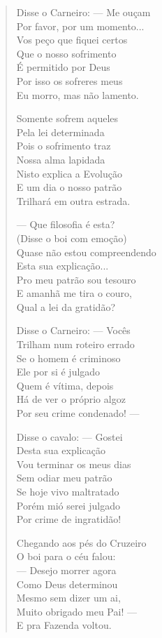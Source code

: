 \begin{verse}
Disse o Carneiro: ---  Me ouçam \\
Por favor, por um momento... \\
Vos peço que fiquei certos \\
Que o nosso sofrimento \\
É permitido por Deus \\
Por isso os sofreres meus \\
Eu morro, mas não lamento. 

Somente sofrem aqueles \\
Pela lei determinada \\
Pois o sofrimento traz \\
Nossa alma lapidada \\
Nisto explica a Evolução \\
E um dia o nosso patrão \\
Trilhará em outra estrada. 

---  Que filosofia é esta? \\
(Disse o boi com emoção) \\
Quase não estou compreendendo \\
Esta sua explicação... \\
Pro meu patrão sou tesouro \\
E amanhã me tira o couro, \\
Qual a lei da gratidão? 


Disse o Carneiro: ---  Vocês \\
Trilham num roteiro errado \\
Se o homem é criminoso \\
Ele por si é julgado \\
Quem é vítima, depois \\
Há de ver o próprio algoz \\
Por seu crime condenado! ---

Disse o cavalo: ---  Gostei \\
Desta sua explicação \\
Vou terminar os meus dias \\
Sem odiar meu patrão \\
Se hoje vivo maltratado \\
Porém mió serei julgado \\
Por crime de ingratidão! 

Chegando aos pés do Cruzeiro \\
O boi para o céu falou: \\
---  Desejo morrer agora \\
Como Deus determinou \\
Mesmo sem dizer um ai, \\
Muito obrigado meu Pai! ---\\
E pra Fazenda voltou. 


\end{verse}
